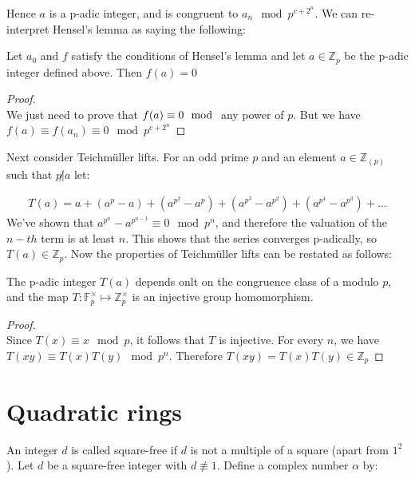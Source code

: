 \documentclass[11pt]{article}
\begin{document}
	Hence $a$ is a p-adic integer, and is congruent to $a_n \mod p^{c+2^n}$.
	We can re-interpret Hensel's lemma as saying the following:

\begin{proposition}
	Let $a_0$ and $f$ satisfy the conditions of Hensel's lemma and let $a \in \mathbb{Z}_p$ be the p-adic integer defined above. Then $f(a) = 0$
\end{proposition}

\begin{proof} $ $ \\
	We just need to prove that $f(a) \equiv 0 \mod $ any power of $p$. But we have $f(a) \equiv f(a_n) \equiv 0 \mod p^{c+2^n}$
\end{proof}

Next consider Teichm\"uller lifts. For an odd prime $p$ and an element $a \in \mathbb{Z}_{(p)}$ such that $p \not | a $ let:

\begin{align*}
	T(a) = a + (a^p - a) + (a^{p^2} - a^p) + (a^{p^3} - a^{p^2}) + (a^{p^4} - a^{p^3}) + \dots
\end{align*}
We've shown that $a^{p^n} - a^{p^{n-1}} \equiv 0 \mod p^n$, and therefore the valuation of the $n-th$ term is at least $n$. This shows that the series converges p-adically, so $T(a) \in \mathbb{Z}_p$. Now the properties of Teichm\"uller lifts can be restated as follows:

\begin{proposition}
	The p-adic integer $T(a)$ depends onlt on the congruence class of a modulo $p$, and the map $T \colon \mathbb{F}_p^\times \mapsto \mathbb{Z}^\times_p$ is an injective group homomorphism.
\end{proposition}

\begin{proof} $ $\\
	Since $T(x) \equiv x \mod p$, it follows that $T$ is injective. For every $n$, we have $T(xy) \equiv T(x)T(y) \mod p^n$. Therefore $T(xy) = T(x)T(y) \in \mathbb{Z}_p$
\end{proof}

\newpage
\section{Quadratic rings}
An integer $d$ is called square-free if $d$ is not a multiple of a square (apart from $1^2$). Let $d$ be a square-free integer with $d\not \equiv 1$. Define a complex number $\alpha$ by:
\end{document}
